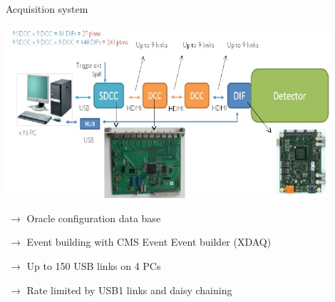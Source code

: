 \documentclass[10pt]{beamer}
\begin{document}
\begin{frame}{Acquisition system}
 \centerline{\includegraphics[width=0.9\textwidth,height=0.45\textheight]{jpg/DAQLinks}}
 \begin{block}
   {\small 
          \par $ ~\rightarrow$  Oracle configuration data base
          \par $ ~\rightarrow$  Event building with CMS Event Event builder (XDAQ)
          \par $ ~ \rightarrow$ Up to 150 USB links on 4 PCs
          \par $ ~\rightarrow$  Rate limited by USB1 links and daisy chaining 


        }
 \end{block}
\end{frame}
\end{document}
